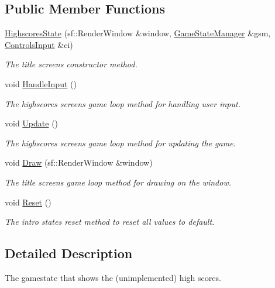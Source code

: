 \subsection*{Public Member Functions}
\begin{DoxyCompactItemize}
\item 
\hyperlink{class_highscores_state_ad01d7f96f196c29ddbdfe1827ae9b894}{Highscores\+State} (sf\+::\+Render\+Window \&window, \hyperlink{class_game_state_manager}{Game\+State\+Manager} \&gsm, \hyperlink{struct_controls_input}{Controls\+Input} \&ci)
\begin{DoxyCompactList}\small\item\em The title screen\textquotesingle{}s constructor method. \end{DoxyCompactList}\item 
void \hyperlink{class_highscores_state_aa8ce1b29acad9790ff065e5c96635c85}{Handle\+Input} ()
\begin{DoxyCompactList}\small\item\em The highscores screen\textquotesingle{}s game loop method for handling user input. \end{DoxyCompactList}\item 
void \hyperlink{class_highscores_state_a8a55079503b5bdaf205e74eb9d48dae0}{Update} ()
\begin{DoxyCompactList}\small\item\em The highscores screen\textquotesingle{}s game loop method for updating the game. \end{DoxyCompactList}\item 
void \hyperlink{class_highscores_state_a50fc2005675f2cc1740e3f9ef698bdab}{Draw} (sf\+::\+Render\+Window \&window)
\begin{DoxyCompactList}\small\item\em The title screen\textquotesingle{}s game loop method for drawing on the window. \end{DoxyCompactList}\item 
void \hyperlink{class_highscores_state_a6368de23eaf55fa1cd40cba04cbd07a0}{Reset} ()
\begin{DoxyCompactList}\small\item\em The intro state\textquotesingle{}s reset method to reset all values to default. \end{DoxyCompactList}\end{DoxyCompactItemize}


\subsection{Detailed Description}
The gamestate that shows the (unimplemented) high scores. 

